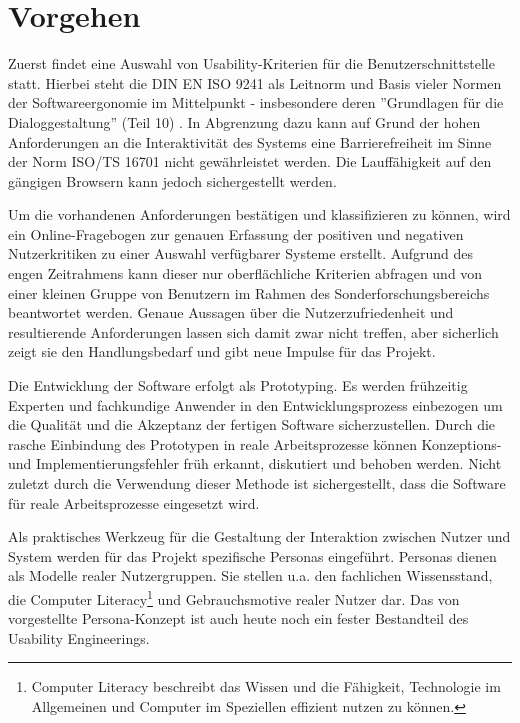

\section{Vorgehen}

Zuerst findet eine Auswahl von Usability-Kriterien für die Benutzerschnittstelle statt. Hierbei steht die DIN EN ISO 9241 als Leitnorm und Basis vieler Normen der Softwareergonomie im Mittelpunkt - insbesondere deren ''Grundlagen für die Dialoggestaltung'' (Teil 10) \citep[][]{beimel94}. In Abgrenzung dazu kann auf Grund der hohen Anforderungen an die Interaktivität des Systems eine Barrierefreiheit im Sinne der Norm ISO/TS 16701 nicht gewährleistet werden. Die Lauffähigkeit auf den gängigen Browsern kann jedoch sichergestellt werden.

Um die vorhandenen Anforderungen bestätigen und klassifizieren zu können, wird ein Online-Fragebogen zur genauen Erfassung der positiven und negativen Nutzerkritiken zu einer Auswahl verfügbarer Systeme erstellt. Aufgrund des engen Zeitrahmens kann dieser nur oberflächliche Kriterien abfragen und von einer kleinen Gruppe von Benutzern im Rahmen des Sonderforschungsbereichs beantwortet werden. Genaue Aussagen über die Nutzerzufriedenheit und resultierende Anforderungen lassen sich damit zwar nicht treffen, aber sicherlich zeigt sie den Handlungsbedarf und gibt neue Impulse für das Projekt. 

Die Entwicklung der Software erfolgt als Prototyping. Es werden frühzeitig Experten und fachkundige Anwender in den Entwicklungsprozess einbezogen um die Qualität und die Akzeptanz der fertigen Software sicherzustellen. Durch die rasche Einbindung des Prototypen in reale Arbeitsprozesse können Konzeptions- und Implementierungsfehler früh erkannt, diskutiert und behoben  werden. Nicht zuletzt durch die Verwendung dieser Methode ist sichergestellt, dass die Software für reale Arbeitsprozesse eingesetzt wird.

Als praktisches Werkzeug für die Gestaltung der Interaktion zwischen Nutzer und System werden für das Projekt spezifische Personas eingeführt. Personas dienen als Modelle realer Nutzergruppen. Sie stellen u.a. den fachlichen Wissensstand, die Computer Literacy\footnote{Computer Literacy beschreibt das Wissen und die Fähigkeit, Technologie im Allgemeinen und Computer im Speziellen effizient nutzen zu können.} und Gebrauchsmotive realer Nutzer dar. Das von \citet{cooper1999inmates} vorgestellte Persona-Konzept ist auch heute noch ein fester Bestandteil des Usability Engineerings.

